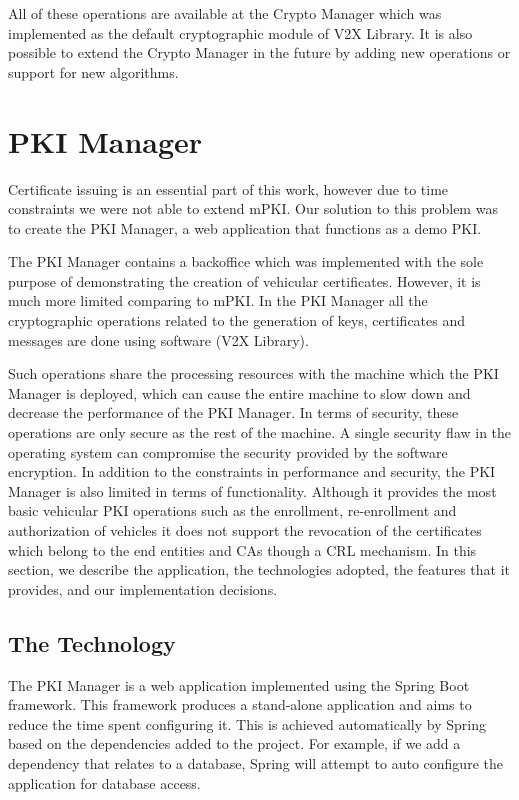 All of these operations are available at the Crypto Manager which was implemented as the default cryptographic module of V2X Library. It is also possible to extend the Crypto Manager in the future by adding new operations or support for new algorithms.


\section{PKI Manager}
Certificate issuing is an essential part of this work, however due to time constraints we were not able to extend mPKI. Our solution to this problem was to create the PKI Manager, a web application that functions as a demo PKI. 

The PKI Manager contains a backoffice which was implemented with the sole purpose of demonstrating the creation of vehicular certificates. However, it is much more limited comparing to mPKI. In the PKI Manager all the cryptographic operations related to the generation of keys, certificates and messages are done using software (V2X Library). 

Such operations share the processing resources with the machine which the PKI Manager is deployed, which can cause the entire machine to slow down and decrease the performance of the PKI Manager. In terms of security, these operations are only secure as the rest of the machine. A single security flaw in the operating system can compromise the security provided by the software encryption. In addition to the constraints in performance and security, the PKI Manager is also limited in terms of functionality. Although it provides the most basic vehicular PKI operations such as the enrollment, re-enrollment and authorization of vehicles it does not support the revocation of the certificates which belong to the end entities and CAs though a CRL mechanism. In this section, we describe the application, the technologies adopted, the features that it provides, and our implementation decisions.

\subsection{The Technology}
The PKI Manager is a web application implemented using the Spring Boot framework. This framework produces a stand-alone application and aims to reduce the time spent configuring it. This is achieved automatically by Spring based on the dependencies added to the project. For example, if we add a dependency that relates to a database, Spring will attempt to auto configure the application for database access.

